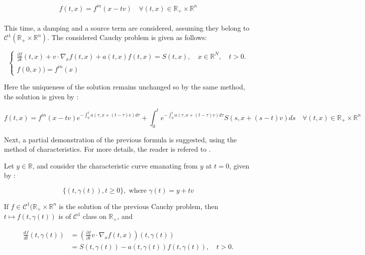 \documentclass[a4paper, 11pt]{article}
\begin{document}
\begin{equation}
f(t,x)=f^{in}(x-tv) \quad \forall (t,x) \in \mathbb{R}_+ \times \mathbb{R}^n 
\end{equation}

\paragraph{}

This time, a damping and a source term are considered, assuming they belong to $\mathcal{C}^1(\mathbb{R}_+ \times \mathbb{R}^n)$. The considered Cauchy problem is given as follows:


\[
\begin{cases}
\frac{\partial f}{\partial t}(t,x)+v \cdot \nabla_x f(t,x) + a(t,x)f(t,x) = S(t,x), \quad x \in \mathbb{R}^N, \quad t>0.\\
f(0,x)) = f^{in}(x)
\end{cases}
\]

\bigbreak

Here the uniqueness of the solution remains unchanged so by the same method, the solution is given by :

\begin{equation}
f(t,x)=f^{in}(x-tv) e^{-\int_0 ^t a(\tau,x+(t-\tau)v)d\tau} + \int_0 ^t  e^{-\int_0 ^t a(\tau,x+(t-\tau)v)d\tau} S(s,x+(s-t)v)ds \quad \forall (t,x) \in \mathbb{R}_+ \times \mathbb{R}^n
\end{equation}

\medbreak

Next, a partial demonstration of the previous formula is suggested, using the method of characteristics. For more details, the reader is refered to \cite{allaire:2019}.

Let $y \in \mathbb{R}$, and consider the characteristic curve emanating from $y$ at $t=0$, given by :

\begin{equation}
\{(t,\gamma(t)),  t\geq 0\} , \text{ where } \gamma (t)=y+tv
\end{equation}

If $f \in \mathcal{C}^1(\mathbb{R}_+ \times \mathbb{R}^n$ is the solution of the previous Cauchy problem, then $t \mapsto f(t,\gamma(t))$ is of $\mathcal{C}^1$ class on $\mathbb{R}_+$, and 


\[
\begin{aligned}
\frac{d f}{d t}(t,\gamma(t))&=(\frac{\partial f}{\partial t}
v \cdot \nabla_x f(t,x))(t,\gamma(t)) \\ &= S(t,\gamma(t))-a(t,\gamma(t))f(t,\gamma(t)), \quad t>0.
\end{aligned}
\]
\end{document}
